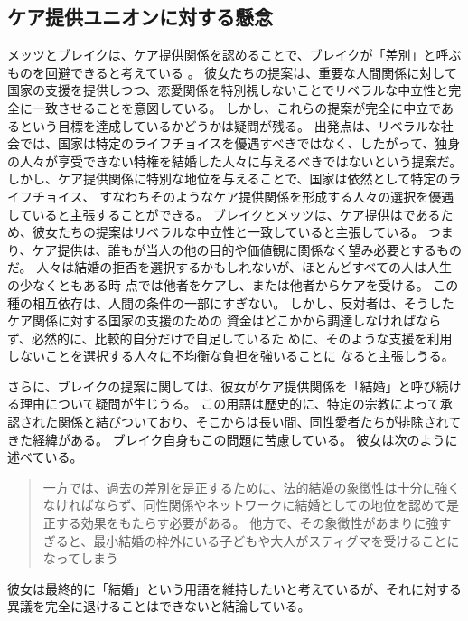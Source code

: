 \documentclass[paper=a4,book,openany]{jlreq}
\begin{document}
\subsection{ケア提供ユニオンに対する懸念}

メッツとブレイクは、ケア提供関係を認めることで、ブレイクが「差別」と呼ぶものを回避できると考えている
\citep[p.89]{brake12:_minim_marriag}。
彼女たちの提案は、重要な人間関係に対して国家の支援を提供しつつ、恋愛関係を特別視しないことでリベラルな中立性と完全に一致させることを意図している。
しかし、これらの提案が完全に中立であるという目標を達成しているかどうかは疑問が残る。
出発点は、リベラルな社会では、国家は特定のライフチョイスを優遇すべきではなく、したがって、独身の人々が享受できない特権を結婚した人々に与えるべきではないという提案だ。
しかし、ケア提供関係に特別な地位を与えることで、国家は依然として特定のライフチョイス、
すなわちそのようなケア提供関係を形成する人々の選択を優遇していると主張することができる。
ブレイクとメッツは、ケア提供はであるため、彼女たちの提案はリベラルな中立性と一致していると主張している。
つまり、ケア提供は、誰もが当人の他の目的や価値観に関係なく望み必要とするものだ。
人々は結婚の拒否を選択するかもしれないが、ほとんどすべての人は人生の少なくともある時
点では他者をケアし、または他者からケアを受ける。
この種の相互依存は、人間の条件の一部にすぎない。
しかし、反対者は、そうしたケア関係に対する国家の支援のための
資金はどこかから調達しなければならず、必然的に、比較的自分だけで自足しているた
めに、そのような支援を利用しないことを選択する人々に不均衡な負担を強いることに
なると主張しうる。

さらに、ブレイクの提案に関しては、彼女がケア提供関係を「結婚」と呼び続ける理由について疑問が生じうる。
この用語は歴史的に、特定の宗教によって承認された関係と結びついており、そこからは長い間、同性愛者たちが排除されてきた経緯がある。
ブレイク自身もこの問題に苦慮している。
彼女は次のように述べている。

\begin{quote}
一方では、過去の差別を是正するために、法的結婚の象徴性は十分に強くなければならず、同性関係やネットワークに結婚としての地位を認めて是正する効果をもたらす必要がある。
他方で、その象徴性があまりに強すぎると、最小結婚の枠外にいる子どもや大人がスティグマを受けることになってしまう\citep[p.187]{brake12:_minim_marriag}
\end{quote}

彼女は最終的に「結婚」という用語を維持したいと考えているが、それに対する異議を完全に退けることはできないと結論している。
\end{document}
